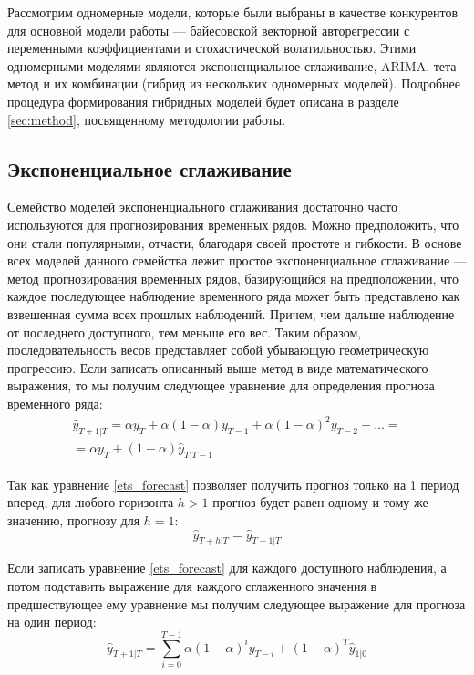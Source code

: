 Рассмотрим одномерные модели, которые были выбраны в качестве конкурентов для основной модели работы --- байесовской векторной авторегрессии с переменными коэффициентами и стохастической волатильностью. Этими одномерными моделями являются экспоненциальное сглаживание, ARIMA, тета-метод и их комбинации (гибрид из нескольких одномерных моделей). Подробнее процедура формирования гибридных моделей будет описана в разделе \ref{sec:method}, посвященному методологии работы.

\subsection{Экспоненциальное сглаживание} \label{sec:ets}
Семейство моделей экспоненциального сглаживания достаточно часто используются для прогнозирования временных рядов. Можно предположить, что они стали популярными, отчасти, благодаря своей простоте и гибкости. В основе всех моделей данного семейства лежит простое экспоненциальное сглаживание --- метод прогнозирования временных рядов, базирующийся на предположении, что каждое последующее наблюдение временного ряда может быть представлено как взвешенная сумма всех прошлых наблюдений. Причем, чем дальше наблюдение от последнего доступного, тем меньше его вес. Таким образом, последовательность весов представляет собой убывающую геометрическую прогрессию. Если записать описанный выше метод в виде математического выражения, то мы получим следующее уравнение для определения прогноза временного ряда:
\begin{multline} \label{ets_forecast}
\hat{y}_{T+1|T} = \alpha y_T + \alpha(1-\alpha)y_{T-1} + \alpha (1-\alpha)^2 y_{T-2} + ... = \\ 
 = \alpha y_{T} + (1-\alpha)\hat{y}_{T|T-1} 
\end{multline}

Так как уравнение \eqref{ets_forecast} позволяет получить прогноз только на 1 период вперед, для любого горизонта $h > 1$ прогноз будет равен одному и тому же значению, прогнозу для $h = 1$:
\begin{equation*}
\hat{y}_{T+h|T} = \hat{y}_{T+1|T}
\end{equation*}

Если записать уравнение \eqref{ets_forecast} для каждого доступного наблюдения, а потом подставить выражение для каждого сглаженного значения в предшествующее ему уравнение мы получим следующее выражение для прогноза на один период:
\begin{equation*} 
\hat{y}_{T+1|T} = \sum_{i = 0}^{T-1}\alpha(1-\alpha)^iy_{T-i} + (1-\alpha)^T \hat{y}_{1|0}
\end{equation*}

